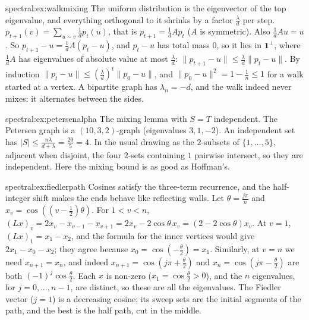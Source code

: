 \begin{solution}{spectral:ex:walkmixing}
\idea The uniform distribution is the eigenvector of the top eigenvalue, and everything orthogonal to it shrinks by a factor $\frac\lambda d$ per step.
\writeup $p_{t+1}(v)=\sum_{u\sim v}\frac1dp_t(u)$, that is $p_{t+1}=\frac1dAp_t$ ($A$ is symmetric). Also $\frac1dAu=u$. So $p_{t+1}-u=\frac1dA(p_t-u)$, and $p_t-u$ has total mass $0$, so it lies in $\mathbf1^\perp$, where
$\frac1dA$ has eigenvalues of absolute value at most $\frac\lambda d$: $\|p_{t+1}-u\|\le\frac\lambda d\|p_t-u\|$. By induction $\|p_t-u\|\le(\frac\lambda d)^t\|p_0-u\|$, and $\|p_0-u\|^2=1-\frac1n\le1$ for a walk started at a vertex. A bipartite
graph has $\lambda_n=-d$, and the walk indeed never mixes: it alternates between the sides.
\end{solution}

\begin{solution}{spectral:ex:petersenalpha}
\idea The mixing lemma with $S=T$ independent.
\writeup The Petersen graph is a $(10,3,2)$-graph (eigenvalues $3,1,-2$). An independent set has $|S|\le\frac{n\lambda}{d+\lambda}=\frac{20}5=4$. In the usual drawing as the $2$-subsets of $\{1,\dots,5\}$, adjacent when disjoint,
the four $2$-sets containing $1$ pairwise intersect, so they are independent. Here the mixing bound is as good as Hoffman's.
\end{solution}

\begin{solution}{spectral:ex:fiedlerpath}
\idea Cosines satisfy the three-term recurrence, and the half-integer shift makes the ends behave like reflecting walls.
\writeup Let $\theta=\frac{j\pi}n$ and $x_v=\cos((v-\frac12)\theta)$. For $1<v<n$, $(Lx)_v=2x_v-x_{v-1}-x_{v+1}=2x_v-2\cos\theta\,x_v=(2-2\cos\theta)x_v$. At $v=1$, $(Lx)_1=x_1-x_2$, and the formula for the
inner vertices would give $2x_1-x_0-x_2$; they agree because $x_0=\cos(-\frac\theta2)=x_1$. Similarly, at $v=n$ we need $x_{n+1}=x_n$, and indeed $x_{n+1}=\cos(j\pi+\frac\theta2)$ and $x_n=\cos(j\pi-\frac\theta2)$ are both $(-1)^j\cos\frac\theta2$. Each $x$
is non-zero ($x_1=\cos\frac\theta2>0$), and the $n$ eigenvalues, for $j=0,\dots,n-1$, are distinct, so these are all the eigenvalues. The Fiedler vector ($j=1$) is a decreasing cosine; its sweep sets are the initial segments of the path, and the best is the
half path, cut in the middle.
\end{solution}

